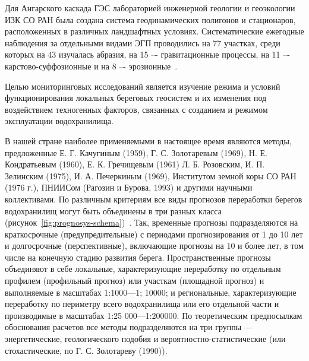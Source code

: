 \documentclass[732,fontsize=14pt,final]{studrep}
\begin{document}
Для Ангарского каскада ГЭС лабораторией инженерной геологии и геоэкологии ИЗК СО РАН была создана система геодинамических полигонов и стационаров, расположенных в различных ландшафтных условиях. Систематические ежегодные наблюдения за отдельными видами ЭГП проводились на 77 участках, среди которых на 43 изучалась абразия, на 15 –- гравитационные процессы, на 11 –- карстово-суффозионные и на 8 –- эрозионные~\cite{koz18}.

Целью мониторинговых исследований является изучение режима и условий функционирования локальных береговых геосистем и их изменения под воздействием техногенных факторов, связанных с созданием и режимом эксплуатации водохранилища.

В нашей стране наиболее применяемыми в настоящее время являются методы, предложенные Е. Г. Качугиным (1959), Г. С. Золотаревым (1969), Н. Е. Кондратьевым (1960), Е. К. Гречищевым (1961) Л. Б. Розовским, И. П. Зелинским (1975), И. А. Печеркиным (1969), Институтом земной коры СО РАН (1976 г.), ПНИИСом (Рагозин и Бурова, 1993) и другими научными коллективами.
По различным критериям все виды прогнозов переработки берегов водохранилищ могут быть объединены в три разных класса (рисунок~\ref{fig:prognosys-schema})~\cite{ivanov01}. Так, временные прогнозы подразделяются на краткосрочные (предупредительные) с периодами прогнозирования от 1 до 10 лет и долгосрочные (перспективные), включающие прогнозы на 10 и более лет, в том числе на конечную стадию развития берега. Пространственные прогнозы объединяют в себе локальные, ха­рактеризующие переработку по отдельным профилем (профильный прогноз) или участкам (площадной прогноз) и выполняемые в масштабах 1:1000—1; 10000; и региональные, характеризующие переработку по периметру всего водохранилища или его отдель­ной части и производимые в масштабах 1:25 000—1:200000. По теоретическим предпосылкам обоснования расчетов все методы подразделяются на три группы — энергетические, геологического подобия и вероятностно-статистические (или стохастические, по Г. С. Золотареву (1990)).
\end{document}

